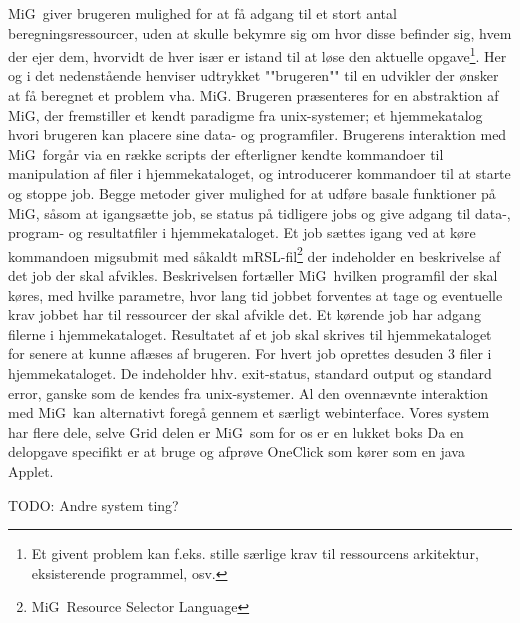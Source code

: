 \documentclass[final,a4paper,10pt]{article}
\newcommand{\mig}{MiG}
\begin{document}
\mig\ giver brugeren mulighed for at få adgang til et stort antal beregningsressourcer, uden at skulle bekymre sig om hvor disse befinder sig, hvem der ejer dem, hvorvidt de hver især er istand til at løse den aktuelle opgave\footnote{Et givent problem kan f.eks. stille særlige krav til ressourcens arkitektur, eksisterende programmel, osv. }. Her og i det nedenstående henviser udtrykket ""brugeren"" til en udvikler der ønsker at få beregnet et problem vha. \mig {}. Brugeren præsenteres for en abstraktion af \mig, der fremstiller et kendt paradigme fra unix-systemer; et hjemmekatalog hvori brugeren kan placere sine data- og programfiler. Brugerens interaktion med \mig\ forgår via en række scripts der efterligner kendte kommandoer til manipulation af filer i hjemmekataloget, og introducerer kommandoer til at starte og stoppe job. Begge metoder giver mulighed for at udføre basale funktioner på \mig, såsom at igangsætte job, se status på tidligere jobs og give adgang til data-, program- og resultatfiler i hjemmekataloget. Et job sættes igang ved at køre kommandoen migsubmit med såkaldt mRSL-fil\footnote{\mig\ Resource Selector Language} der indeholder en beskrivelse af det job der skal afvikles. Beskrivelsen fortæller \mig\ hvilken programfil der skal køres, med hvilke parametre, hvor lang tid jobbet forventes at tage og eventuelle krav jobbet har til ressourcer der skal afvikle det. Et kørende job har adgang filerne i  hjemmekataloget. Resultatet af et job skal skrives til hjemmekataloget for senere at kunne aflæses af brugeren. For hvert job oprettes desuden 3 filer i hjemmekataloget. De indeholder hhv. exit-status, standard output og standard error, ganske som de kendes fra unix-systemer. 
Al den ovennævnte interaktion med \mig\ kan alternativt foregå gennem et særligt webinterface. 
Vores system har flere dele, selve Grid delen er \mig\ som for os er en lukket boks
Da en delopgave specifikt er at bruge og afprøve OneClick som kører som en java Applet.

TODO: Andre system ting?
\end{document}
